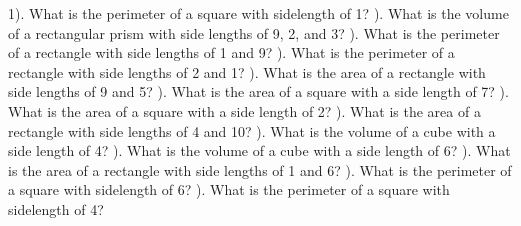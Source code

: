 \documentclass{article}%
\begin{document}
1). What is the perimeter of a square with sidelength of 1?%
\newline%
\newline%
). What is the volume of a rectangular prism with side lengths of 9, 2, and 3?%
\newline%
\newline%
). What is the perimeter of a rectangle with side lengths of 1 and 9?%
\newline%
\newline%
). What is the perimeter of a rectangle with side lengths of 2 and 1?%
\newline%
\newline%
). What is the area of a rectangle with side lengths of 9 and 5?%
\newline%
\newline%
). What is the area of a square with a side length of 7?%
\newline%
\newline%
). What is the area of a square with a side length of 2?%
\newline%
\newline%
). What is the area of a rectangle with side lengths of 4 and 10?%
\newline%
\newline%
). What is the volume of a cube with a side length of 4?%
\newline%
\newline%
). What is the volume of a cube with a side length of 6?%
\newline%
\newline%
). What is the area of a rectangle with side lengths of 1 and 6?%
\newline%
\newline%
). What is the perimeter of a square with sidelength of 6?%
\newline%
\newline%
). What is the perimeter of a square with sidelength of 4?%
\end{document}
